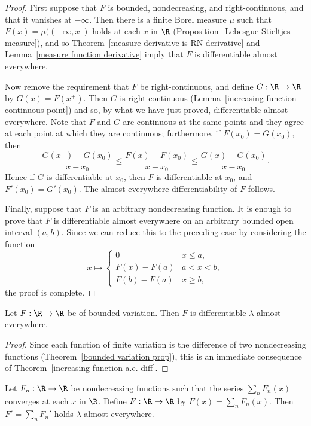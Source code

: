 \begin{proof}
First suppose that $F$ is bounded, nondecreasing, and right-continuous, and
that it vanishes at $-\infty$. Then there is a finite Borel measure $\mu$ such that $F(x)=\mu((-\infty,x])$ holds at each $x$ in $\R$ (Proposition~\ref{Lebesgue-Stieltjes measure}), and so Theorem~\ref{measure derivative is RN derivative} and Lemma~\ref{measure function derivative} imply that $F$ is differentiable almost everywhere.\par
Now remove the requirement that $F$ be right-continuous, and define $G:\R\to\R$ by $G(x)=F(x^+)$. Then $G$ is right-continuous (Lemma~\ref{increasing function continuous point}) and so, by what we have just proved, differentiable almost everywhere. Note that $F$ and $G$ are continuous at the same points and they agree at each point at which they are continuous; furthermore, if $F(x_0)=G(x_0)$, then 
\[\frac{G(x^-)-G(x_0)}{x-x_0}\leq\frac{F(x)-F(x_0)}{x-x_0}\leq\frac{G(x)-G(x_0)}{x-x_0}.\]
Hence if $G$ is differentiable at $x_0$, then $F$ is differentiable at $x_0$, and $F'(x_0)=G'(x_0)$. The almost everywhere differentiability of $F$ follows.\par
Finally, suppose that $F$ is an arbitrary nondecreasing function. It is enough to prove that $F$ is differentiable almost everywhere on an arbitrary bounded open interval $(a,b)$. Since we can reduce this to the preceding case by considering the function
\[x\mapsto\begin{cases}
0&x\leq a,\\
F(x)-F(a)&a<x<b,\\
F(b)-F(a)&x\geq b,
\end{cases}\]
the proof is complete.
\end{proof}
\begin{corollary}
Let $F:\R\to\R$ be of bounded variation. Then $F$ is differentiable $\lambda$-almost everywhere.
\end{corollary}
\begin{proof}
Since each function of finite variation is the difference of two nondecreasing functions (Theorem~\ref{bounded variation prop}), this is an immediate consequence of Theorem~\ref{increasing function a.e. diff}.
\end{proof}
\begin{proposition}\label{sum differentiation change}
Let $F_n:\R\to\R$ be nondecreasing functions such that the series $\sum_nF_n(x)$ converges at each $x$ in $\R$. Define $F:\R\to\R$ by $F(x)=\sum_nF_n(x)$. Then $F'=\sum_nF_n'$ holds $\lambda$-almost everywhere.
\end{proposition}
